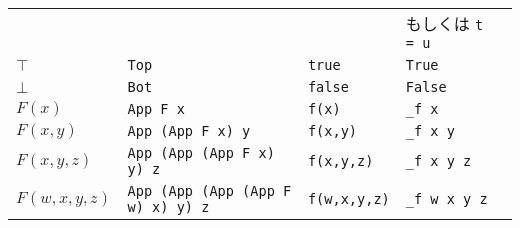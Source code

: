 \documentclass{article}
\begin{document}
\begin{tabular}{lllll}
            &  &                      & {\normalsize もしくは} \verb|t = u| & \\
\medskip
$\top$ & \verb|Top| & \verb|true| & \verb|True| & \\
\medskip
$\bot$ & \verb|Bot| & \verb|false| & \verb|False| & \\
$F(x)$ & \verb|App F x| & \verb|f(x)| & \verb|_f x| \\
$F(x,y)$ & \verb|App (App F x) y| & \verb|f(x,y)| & \verb|_f x y| \\
$F(x,y,z)$ & \verb|App (App (App F x) y) z| & \verb|f(x,y,z)| & \verb|_f x y z|\\
$F(w,x,y,z)$ & \verb|App (App (App (App F w) x) y) z| & \verb|f(w,x,y,z)| & \verb|_f w x y z|\\
\end{tabular}
\end{document}
